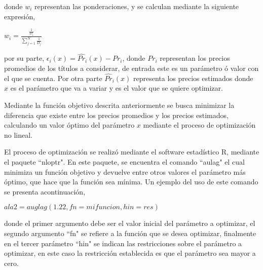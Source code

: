 \vspace{0.5cm}
\noindent donde $w_{i}$ representan las ponderaciones, y se calculan mediante la siguiente expresi\'on,\\

\begin{center}

$\displaystyle{w_{i} = \frac{\frac{1}{D_{i}}}{\sum_{j=1}^{N}\frac{1}{D_{j}}}}$

\end{center}

\vspace{0.5cm}

\noindent por su parte, $\epsilon_{i}(x)= \hat{Pr}_{i}(x)-Pr_{i}$, donde $Pr_{i}$ representan los precios promedios de los t\'itulos a considerar, de entrada este es un par\'ametro \'o valor con el que se cuenta. Por otra parte $\hat{Pr}_{i}(x)$ representa los precios estimados donde $x$ es el par\'ametro que va a variar y es el valor que se quiere optimizar.

\vspace{0.5cm}

\hspace{0.4cm} Mediante la funci\'on objetivo descrita anteriormente se busca minimizar la diferencia que existe entre los precios promedios y los precios estimados, calculando un valor \'optimo del par\'ametro $x$ mediante el proceso de optimizaci\'on no lineal.

\vspace{0.5cm}

\hspace{0.4cm}El proceso de optimizaci\'on se realiz\'o mediante el software estad\'istico R, mediante el paquete ``nloptr". En este paquete, se encuentra el comando ``aulag" el cual minimiza un funci\'on objetivo y devuelve entre otros valores el par\'ametro m\'as \'optimo, que hace que la funci\'on sea m\'inima. Un ejemplo del uso de este comando se presenta acontinuaci\'on,

\vspace{0.5cm}
\begin{center}
  $ala2=auglag(1.22, fn=mifuncion, hin=res)$
\end{center}

\vspace{0.5cm}

\noindent donde el primer argumento debe ser el valor inicial del par\'ametro a optimizar, el segundo argumento ``fn" se refiere a la funci\'on que se desea optimizar, finalmente en el tercer par\'ametro ``hin" se indican las restricciones sobre el par\'ametro a optimizar, en este caso la restricci\'on establecida es que el par\'ametro sea mayor a cero.


